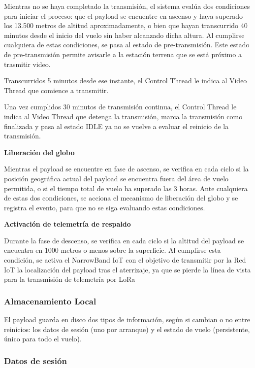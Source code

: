 \documentclass[12pt,a4paper]{article}
\begin{document}
Mientras no se haya completado la transmisión, el sistema evalúa dos condiciones para iniciar el proceso: que el payload se encuentre en ascenso y haya superado los 13.500 metros de altitud aproximadamente, o bien que hayan transcurrido 40 minutos desde el inicio del vuelo sin haber alcanzado dicha altura. Al cumplirse cualquiera de estas condiciones, se pasa al estado de pre-transmisión. Este estado de pre-transmisión permite avisarle a la estación terrena que se está próximo a trasmitir video.

Transcurridos 5 minutos desde ese instante, el Control Thread le indica al Video Thread que comience a transmitir.

Una vez cumplidos 30 minutos de transmisión continua, el Control Thread le indica al Video Thread que detenga la transmisión, marca la transmisión como finalizada y pasa al estado IDLE ya no se vuelve a evaluar el reinicio de la transmisión.

\textbf{Liberación del globo}

Mientras el payload se encuentre en fase de ascenso, se verifica en cada ciclo si la posición geográfica actual del payload se encuentra fuera del área de vuelo permitida, o si el tiempo total de vuelo ha superado las 3 horas. Ante cualquiera de estas dos condiciones, se acciona el mecanismo de liberación del globo y se registra el evento, para que no se siga evaluando estas condiciones.

\textbf{Activación de telemetría de respaldo}

Durante la fase de descenso, se verifica en cada ciclo si la altitud del payload se encuentra en 1000 metros o menos sobre la superficie. Al cumplirse esta condición, se activa el NarrowBand IoT con el objetivo de transmitir por la Red IoT la localización del payload tras el aterrizaje, ya que se pierde la línea de vista para la transmisión de telemetría por LoRa

\subsubsection{Almacenamiento Local}\label{almacenamiento-local}

El payload guarda en disco dos tipos de información, según si cambian o no entre reinicios: los datos de sesión (uno por arranque) y el estado de vuelo (persistente, único para todo el vuelo).

\subsubsection*{Datos de sesión}\label{datos-de-sesiuxf3n}
\end{document}
